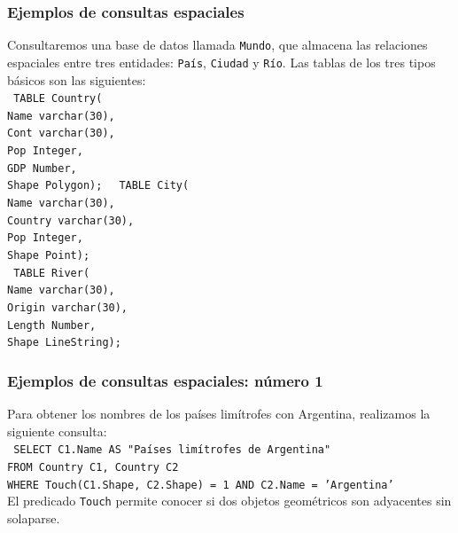 \begin{frame}
		\frametitle{Ejemplos de consultas espaciales}
		Consultaremos una base de datos llamada \texttt{Mundo}, que almacena las relaciones espaciales entre tres entidades: \texttt{País}, \texttt{Ciudad} y \texttt{Río}. Las tablas de los tres tipos básicos son las siguientes: \\
		\texttt{
				TABLE Country( \\
				Name varchar(30), \\
				Cont varchar(30), \\
				Pop Integer, \\
				GDP Number, \\
				Shape Polygon);
		}
		\texttt{
				TABLE City( \\
				Name varchar(30), \\
				Country varchar(30), \\
				Pop Integer, \\
				Shape Point); \\
		}
		\texttt{
				TABLE River( \\
				Name varchar(30), \\
				Origin varchar(30), \\
				Length Number, \\
				Shape LineString);
		}

\end{frame}

\begin{frame}
		\frametitle{Ejemplos de consultas espaciales: número 1}
		Para obtener los nombres de los países limítrofes con Argentina, realizamos la siguiente consulta: \\
		\texttt{
				SELECT C1.Name AS "Países limítrofes de Argentina" \\
				FROM Country C1, Country C2 \\
				WHERE Touch(C1.Shape, C2.Shape) = 1 AND C2.Name = 'Argentina'
		} \\
		El predicado \texttt{Touch} permite conocer si dos objetos geométricos son adyacentes sin solaparse.
\end{frame}

